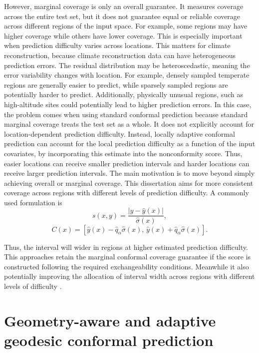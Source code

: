 \documentclass[11pt,a4paper]{report}
\begin{document}
However, marginal coverage is only an overall guarantee. It measures coverage across the entire test set, but it does not guarantee equal or reliable coverage across different regions of the input space. For example, some regions may have higher coverage while others have lower coverage. This is especially important when prediction difficulty varies across locations. This matters for climate reconstruction, because climate reconstruction data can have heterogeneous prediction errors. The residual distribution may be heteroscedastic, meaning the error variability changes with location. For example, densely sampled temperate regions are generally easier to predict, while sparsely sampled regions are potentially harder to predict. Additionally, physically unusual regions, such as high-altitude sites could potentially lead to higher prediction errors. In this case, the problem comes when using standard conformal prediction because standard marginal coverage treats the test set as a whole. It does not explicitly account for location-dependent prediction difficulty. Instead, locally adaptive conformal prediction can account for the local prediction difficulty as a function of the input covariates, by incorporating this estimate into the nonconformity score. Thus, easier locations can receive smaller prediction intervals and harder locations can receive larger prediction intervals. The main motivation is to move beyond simply achieving overall or marginal coverage. This dissertation aims for more consistent coverage across regions with different levels of prediction difficulty. A commonly used formulation is
\begin{equation}
s(x,y) = \frac{|y-\hat y(x)|}{\hat\sigma(x)},
\label{eq:adaptive-score}
\end{equation}
\begin{equation}
C(x) =
\left[
\hat y(x)-\hat q_\alpha\hat\sigma(x),\,
\hat y(x)+\hat q_\alpha\hat\sigma(x)
\right].
\label{eq:adaptive-interval}
\end{equation}

Thus, the interval will wider in regions at higher estimated prediction difficulty. This approaches retain the marginal conformal coverage guarantee if the score is constructed following the required exchangeability conditions. Meanwhile it also potentially improving the allocation of interval width across regions with different levels of difficulty \citep{lei2018,romano2019}.


\section{Geometry-aware and adaptive geodesic conformal prediction}
\label{sec:geodesic-cp-background}
\end{document}
